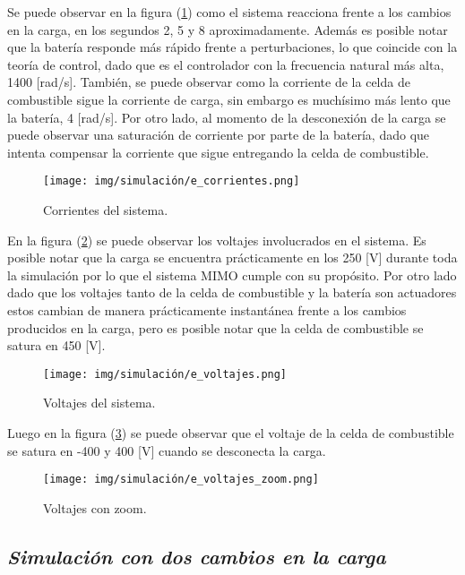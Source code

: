 Se puede observar en la figura (\ref{fig:e_corrientes}) como el sistema reacciona
frente a los cambios en la carga, en los segundos 2, 5 y 8 aproximadamente.
Además es posible notar que la batería responde más rápido frente a perturbaciones,
lo que coincide con la teoría de control, dado que es el controlador con la
frecuencia natural más alta, 1400 [rad/s]. También, se puede observar como la corriente de la celda de combustible
sigue la corriente de carga, sin embargo es muchísimo más lento que la batería, 4 [rad/s]. Por otro lado,
al momento de la desconexión de la carga se puede observar una saturación de corriente por parte
de la batería, dado que intenta compensar la corriente que sigue entregando la celda de combustible.

\begin{figure}[H]
    \centering
    \texttt{[image: img/simulación/e\_corrientes.png]}
    \caption{Corrientes del sistema.}
    \label{fig:e_corrientes}
\end{figure}

En la figura (\ref{fig:e_voltajes}) se puede observar los voltajes involucrados
en el sistema. Es posible notar que la carga se encuentra prácticamente en 
los 250 [V] durante toda la simulación por lo que el sistema MIMO cumple con 
su propósito. Por otro lado dado que los voltajes tanto de la celda de 
combustible y la batería son actuadores estos cambian de manera prácticamente
instantánea frente a los cambios producidos en la carga, pero es posible notar
que la celda de combustible se satura en 450 [V].

\begin{figure}[H]
    \centering
    \texttt{[image: img/simulación/e\_voltajes.png]}
    \caption{Voltajes del sistema.}
    \label{fig:e_voltajes}
\end{figure}

Luego en la figura (\ref{fig:e_voltajes_zoom}) se puede observar que el 
voltaje de la celda de combustible se satura en -400 y 400 [V] cuando se
desconecta la carga.

\begin{figure}[H]
    \centering
    \texttt{[image: img/simulación/e\_voltajes\_zoom.png]}
    \caption{Voltajes con zoom.}
    \label{fig:e_voltajes_zoom}
\end{figure}



\subsection{\textit{Simulación con dos cambios en la carga}}

